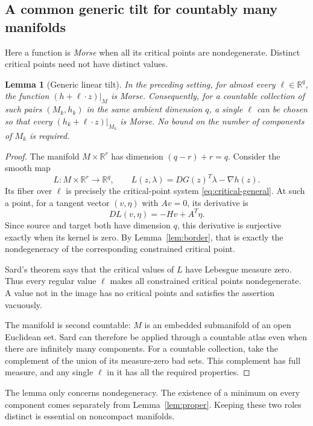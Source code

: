 \documentclass[11pt]{article}
\newtheorem{lemma}[theorem]{Lemma}
\theoremstyle{definition}
\theoremstyle{remark}
\newcommand{\R}{\mathbb R}
\begin{document}
\subsection{A common generic tilt for countably many manifolds}

Here a function is \emph{Morse} when all its critical points are
nondegenerate. Distinct critical points need not have distinct values.

\begin{lemma}[Generic linear tilt]
\label{lem:tilt}
In the preceding setting, for almost every
\(\ell\in\R^q\), the function \((h+\ell\cdot z)|_M\) is Morse.
Consequently, for a countable collection of such pairs \((M_k,h_k)\)
in the same ambient dimension \(q\), a single \(\ell\) can be chosen
so that every \((h_k+\ell\cdot z)|_{M_k}\) is Morse.
No bound on the number of components of \(M_k\) is required.
\end{lemma}

\begin{proof}
The manifold \(M\times\R^r\) has dimension
\((q-r)+r=q\). Consider the smooth map
\[
 L:M\times\R^r\longrightarrow\R^q,\qquad
 L(z,\lambda)=DG(z)^T\lambda-\nabla h(z).
\]
Its fiber over \(\ell\) is precisely the critical-point system
\eqref{eq:critical-general}. At such a point, for a tangent vector
\((v,\eta)\) with \(Av=0\), its derivative is
\[
 DL(v,\eta)=-Hv+A^T\eta.
\]
Since source and target both have dimension \(q\), this derivative is
surjective exactly when its kernel is zero. By Lemma~\ref{lem:border},
that is exactly the nondegeneracy of the corresponding constrained
critical point.

Sard's theorem says that the critical values of \(L\) have Lebesgue
measure zero. Thus every regular value \(\ell\) makes all constrained
critical points nondegenerate. A value not in the image has no critical
points and satisfies the assertion vacuously.

The manifold is second countable: \(M\) is an embedded submanifold of
an open Euclidean set. Sard can therefore be applied through a
countable atlas even when there are infinitely many components.
For a countable collection, take the complement of the union of its
measure-zero bad sets. This complement has full measure, and any
single \(\ell\) in it has all the required properties.
\end{proof}

The lemma only concerns nondegeneracy. The existence of a minimum on
every component comes separately from Lemma~\ref{lem:proper}. Keeping
these two roles distinct is essential on noncompact manifolds.
\end{document}
